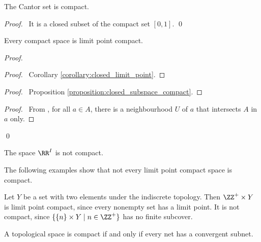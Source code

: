 \begin{example}
    The Cantor set is compact.
\end{example}

\begin{proof}
    \pf\ It is a closed subset of the compact set $[0,1]$. \qed
\end{proof}

\begin{proposition}
    \label{proposition:limit_point_compact_compact}
    Every compact space is limit point compact.
\end{proposition}

\begin{proof}
    \pf
    \begin{proof}
        \pf\ Corollary \ref{corollary:closed_limit_point}.
    \end{proof}
    \begin{proof}
        \pf\ Proposition \ref{proposition:closed_subspace_compact}.
    \end{proof}
    \begin{proof}
        \pf\ From , for all $a \in A$, there is a neighbourhood
        $U$ of $a$ that intersects $A$ in $a$ only.
    \end{proof}
    \qed
\end{proof}

\begin{corollary}
    The space $\RR^I$ is not compact.
\end{corollary}

The following examples show that not every limit point compact space is compact.
\begin{example}
    Let $Y$ be a set with two elements under the indiscrete topology.
    Then $\ZZ^+ \times Y$ is limit point compact, since every nonempty set has
    a limit point. It is not compact, since $\{ \{ n \} \times Y \mid n \in \ZZ^+ \}$
    has no finite subcover.
\end{example}

\begin{proposition}[AC]
    A topological space is compact if and only if every net has a convergent subnet.
\end{proposition}

